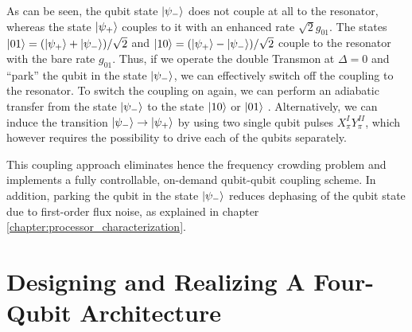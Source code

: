 %
As can be seen, the qubit state $\left| \psi_- \right>$ does not couple at all to the resonator, whereas the state $\left| \psi_+ \right>$ couples to it with an enhanced rate $\sqrt{2}g_{01}$. The states $\left| 01 \right>=(\left| \psi_+ \right>+\left| \psi_- \right>)/\sqrt{2}$ and $\left| 10 \right>=(\left| \psi_+ \right>-\left| \psi_- \right>)/\sqrt{2}$ couple to the resonator with the bare rate $g_{01}$. Thus, if we operate the double Transmon at $\Delta = 0$ and ``park'' the qubit in the state $\left| \psi_- \right>$, we can effectively switch off the coupling to the resonator. To switch the coupling on again, we can perform an adiabatic transfer from the state $\left| \psi_- \right>$ to the state $\left| 10 \right>$ or $\left| 01 \right>$ \citep{srinivasan_tunable_2011}. Alternatively, we can induce the transition $\left| \psi_- \right>\to\left| \psi_+ \right>$ by using two single qubit pulses $X^I_\pi Y^{II}_\pi$, which however requires the possibility to drive each of the qubits separately.

\smallskip

This coupling approach eliminates hence the frequency crowding problem and implements a fully controllable, on-demand qubit-qubit coupling scheme. In addition, parking the qubit in the state $\left| \psi_- \right>$ reduces dephasing of the qubit state due to first-order flux noise, as explained in chapter \ref{chapter:processor_characterization}. 

%
%

\section{Designing and Realizing A Four-Qubit Architecture}

